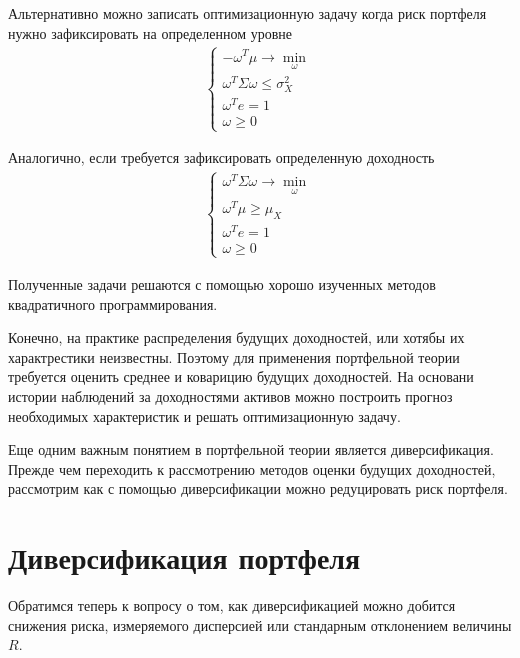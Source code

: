 Альтернативно можно записать оптимизационную задачу когда риск портфеля нужно зафиксировать на определенном уровне
\begin{align}
	\begin{cases}
		-\omega^T \mu \rightarrow \min_{\omega} \\
		\omega^T \Sigma \omega \le \sigma_X^2 \\
		\omega^T e = 1 \\
		\omega \ge 0
	\end{cases}
\end{align}

Аналогично, если требуется зафиксировать определенную доходность
\begin{align}
	\begin{cases}
		\omega^T \Sigma \omega \rightarrow \min_{\omega} \\
		\omega^T \mu \ge \mu_X \\
		\omega^T e = 1 \\
		\omega \ge 0
	\end{cases}
\end{align}


Полученные задачи решаются с помощью хорошо изученных методов квадратичного программирования.

Конечно, на практике распределения будущих доходностей, или хотябы их характрестики неизвестны.
Поэтому для применения портфельной теории требуется оценить среднее и коварицию будущих доходностей.
На основани истории наблюдений за доходностями активов можно построить прогноз необходимых характеристик
и решать оптимизационную задачу.

Еще одним важным понятием в портфельной теории является диверсификация. Прежде чем переходить к рассмотрению методов оценки
будущих доходностей, рассмотрим как с помощью диверсификации можно редуцировать риск портфеля.

\section{Диверсификация портфеля}

Обратимся теперь к вопросу о том, как диверсификацией можно добится снижения риска, измеряемого дисперсией
или стандарным отклонением величины $R$.

